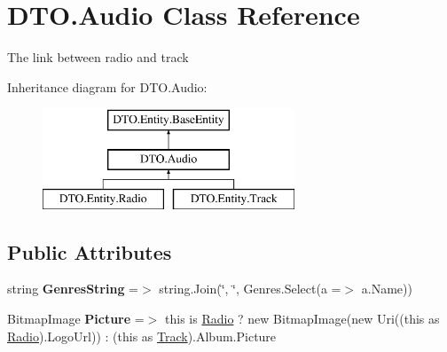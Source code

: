 \hypertarget{class_d_t_o_1_1_audio}{}\section{D\+T\+O.\+Audio Class Reference}
\label{class_d_t_o_1_1_audio}


The link between radio and track  


Inheritance diagram for D\+T\+O.\+Audio\+:\begin{figure}[H]
\begin{center}
\leavevmode
\includegraphics[height=3.000000cm]{class_d_t_o_1_1_audio}
\end{center}
\end{figure}
\subsection*{Public Attributes}
\begin{DoxyCompactItemize}
\item 
\mbox{\label{class_d_t_o_1_1_audio_a5f75b29b3d11be9b911f68cec3977609}} 
string {\bfseries Genres\+String} =$>$ string.\+Join(\char`\"{}, \char`\"{}, Genres.\+Select(a =$>$ a.\+Name))
\item 
\mbox{\label{class_d_t_o_1_1_audio_aaf2c66c9254f4ced7b106ae23184d85c}} 
Bitmap\+Image {\bfseries Picture} =$>$ this is \hyperlink{class_d_t_o_1_1_entity_1_1_radio}{Radio} ? new Bitmap\+Image(new Uri((this as \hyperlink{class_d_t_o_1_1_entity_1_1_radio}{Radio}).Logo\+Url)) \+: (this as \hyperlink{class_d_t_o_1_1_entity_1_1_track}{Track}).Album.\+Picture
\end{DoxyCompactItemize}

